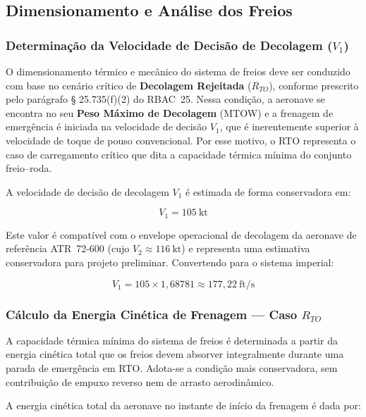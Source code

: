 \subsection{Dimensionamento e Análise dos Freios}
\label{sec:dimensionamento_freios}
\subsubsection{Determinação da Velocidade de Decisão de Decolagem ($V_1$)}

O dimensionamento térmico e mecânico do sistema de freios deve ser conduzido com base
no cenário crítico de \textbf{Decolagem Rejeitada} ($R_{TO}$),
conforme prescrito pelo parágrafo § 25.735(f)(2) do RBAC~25. Nessa condição, a aeronave
se encontra no seu \textbf{Peso Máximo de Decolagem} (MTOW) e a frenagem de emergência
é iniciada na velocidade de decisão $V_1$, que é inerentemente superior à velocidade de
toque de pouso convencional. Por esse motivo, o RTO representa o caso de carregamento
crítico que dita a capacidade térmica mínima do conjunto freio--roda.

A velocidade de decisão de decolagem $V_1$ é estimada de forma conservadora em:

\begin{equation}
    V_1 = 105 \ \text{kt}
\end{equation}

Este valor é compatível com o envelope operacional de decolagem da aeronave de
referência ATR~72-600 (cujo $V_2 \approx 116\ \text{kt}$) e representa uma estimativa
conservadora para projeto preliminar. Convertendo para o sistema imperial:

\begin{equation}
    V_1 = 105 \times 1{,}68781 \approx 177{,}22 \ \text{ft/s}
\end{equation}


\subsubsection{Cálculo da Energia Cinética de Frenagem — Caso $R_{TO}$}

A capacidade térmica mínima do sistema de freios é determinada a partir da energia
cinética total que os freios devem absorver integralmente durante uma parada de
emergência em RTO. Adota-se a condição mais conservadora, sem contribuição de
empuxo reverso nem de arrasto aerodinâmico.

A energia cinética total da aeronave no instante de início da frenagem é dada por:

